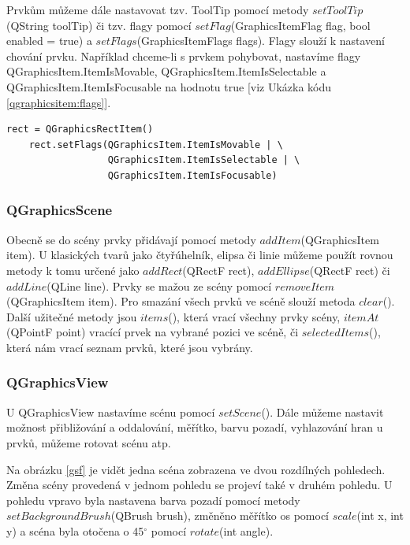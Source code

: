 Prvkům můžeme dále nastavovat tzv. ToolTip pomocí metody $setToolTip$(QString toolTip) či tzv. flagy pomocí $setFlag$(GraphicsItemFlag flag, bool enabled = true) a $setFlags$(GraphicsItemFlags flags). Flagy slouží k nastavení chování prvku. Například chceme-li s prvkem pohybovat, nastavíme flagy QGraphicsItem.ItemIsMovable, QGraphicsItem.ItemIsSelectable a QGraphicsItem.ItemIsFocusable na hodnotu true [viz Ukázka kódu \ref{qgraphicsitem:flags}].\\
 
\begin{lstlisting}[label=qgraphicsitem:flags,caption={Nastavení flagů u QGraphicsRectItem}, morekeywords={QGraphicsItem, QGraphicsRectItem}] 
	rect = QGraphicsRectItem()
	rect.setFlags(QGraphicsItem.ItemIsMovable | \
				  QGraphicsItem.ItemIsSelectable | \
				  QGraphicsItem.ItemIsFocusable)
\end{lstlisting}
 
\subsubsection*{QGraphicsScene}
Obecně se do scény prvky přidávají pomocí metody $addItem$(QGraphicsItem item). U klasických tvarů jako čtyřúhelník, elipsa či linie můžeme použít rovnou metody k tomu určené jako $addRect$(QRectF rect), $addEllipse$(QRectF rect) či $addLine$(QLine line). Prvky se mažou ze scény pomocí $removeItem$(QGraphicsItem item). Pro smazání všech prvků ve scéně slouží metoda $clear$(). Další užitečné metody jsou $items$(), která vrací všechny prvky scény, $itemAt$(QPointF point) vracící prvek na vybrané pozici ve scéně, či $selectedItems$(), která nám vrací seznam prvků, které jsou vybrány.

\subsubsection*{QGraphicsView}
U QGraphicsView nastavíme scénu pomocí $setScene$(). Dále můžeme nastavit možnost přibližování a oddalování, měřítko, barvu pozadí, vyhlazování hran u prvků, můžeme rotovat scénu atp.

Na obrázku \ref{gsf} je vidět jedna scéna zobrazena ve dvou rozdílných pohledech. Změna scény provedená v jednom pohledu se projeví také v druhém pohledu. U pohledu vpravo byla nastavena barva pozadí pomocí metody $setBackgroundBrush$(QBrush brush), změněno měřítko os pomocí $scale$(int x, int y) a scéna byla otočena o 45$^\circ$ pomocí $rotate$(int angle). \\

